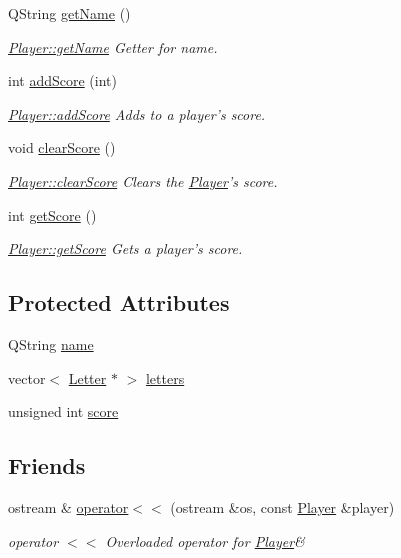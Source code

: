 \begin{DoxyCompactItemize}
Q\-String \hyperlink{class_player_ade0334ac0e87ac1c5e09ce78f2cafd83}{get\-Name} ()
\begin{DoxyCompactList}\small\item\em \hyperlink{class_player_ade0334ac0e87ac1c5e09ce78f2cafd83}{Player\-::get\-Name} Getter for name. \end{DoxyCompactList}\item 
int \hyperlink{class_player_aa5bead96a6eb9cc33fbc086662621caf}{add\-Score} (int)
\begin{DoxyCompactList}\small\item\em \hyperlink{class_player_aa5bead96a6eb9cc33fbc086662621caf}{Player\-::add\-Score} Adds to a player's score. \end{DoxyCompactList}\item 
void \hyperlink{class_player_a6e2f0837237f65c67948585ed2be56f9}{clear\-Score} ()
\begin{DoxyCompactList}\small\item\em \hyperlink{class_player_a6e2f0837237f65c67948585ed2be56f9}{Player\-::clear\-Score} Clears the \hyperlink{class_player}{Player}'s score. \end{DoxyCompactList}\item 
int \hyperlink{class_player_a97e5447778ae6c384eedc532dcd8431d}{get\-Score} ()
\begin{DoxyCompactList}\small\item\em \hyperlink{class_player_a97e5447778ae6c384eedc532dcd8431d}{Player\-::get\-Score} Gets a player's score. \end{DoxyCompactList}\end{DoxyCompactItemize}
\subsection*{Protected Attributes}
\begin{DoxyCompactItemize}
\item 
Q\-String \hyperlink{class_player_ac41b72814d9c41222dac999bc874280b}{name}
\item 
vector$<$ \hyperlink{class_letter}{Letter} $\ast$ $>$ \hyperlink{class_player_abd40dc8f6d524bd1331a8133e9bb8902}{letters}
\item 
unsigned int \hyperlink{class_player_a38a6dafe988a768a435cc0a9fde38e46}{score}
\end{DoxyCompactItemize}
\subsection*{Friends}
\begin{DoxyCompactItemize}
\item 
ostream \& \hyperlink{class_player_a79571356003607b80edc6440c851e503}{operator$<$$<$} (ostream \&os, const \hyperlink{class_player}{Player} \&player)
\begin{DoxyCompactList}\small\item\em operator $<$$<$ Overloaded operator for \hyperlink{class_player}{Player}\& \end{DoxyCompactList}\end{DoxyCompactItemize}


